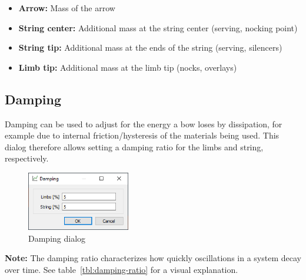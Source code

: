 \documentclass[12pt]{article}
\begin{document}
\begin{itemize}
\item \textbf{Arrow:} Mass of the arrow
\item \textbf{String center:} Additional mass at the string center (serving, nocking point)
\item \textbf{String tip:} Additional mass at the ends of the string (serving, silencers)
\item \textbf{Limb tip:} Additional mass at the limb tip (nocks, overlays)
\end{itemize}

\newpage
\subsection{Damping}

Damping can be used to adjust for the energy a bow loses by dissipation, for example due to internal friction/hysteresis of the materials being used.
This dialog therefore allows setting a damping ratio for the limbs and string, respectively.

\begin{figure}[H]
\centering
\includegraphics[width=0.4\textwidth]{figures/screenshots/input/damping}
\caption{Damping dialog}
\label{fig:damping}
\end{figure}

\textbf{Note:} The damping ratio characterizes how quickly oscillations in a system decay over time. See table~\ref{tbl:damping-ratio} for a visual explanation.
\end{document}
